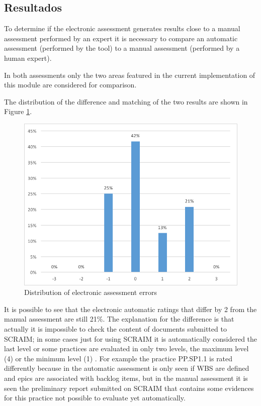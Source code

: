 \documentclass[9pt,a4paper]{extarticle}
\begin{document}
\begin{multicols}{2}
\subsection{Resultados}
To determine if the electronic assessment generates results close to a manual assessment performed by an expert it is necessary to compare an automatic assessment (performed by the tool) to a manual assessment (performed by a human expert).

In both assessments only the two areas featured in the current implementation of this module are considered for comparison.

The distribution of the difference and matching of the two results are shown in Figure \ref{fig:figura2}.

\begin{figure}[H]
	\centerline{\includegraphics[scale=.5]{delta.png}}
	\caption{Distribution of electronic assessment errors}  
	\label{fig:figura2}
\end{figure}


It is possible to see that the electronic automatic ratings that differ by 2 from the manual assessment are still 21\%. The explanation for the difference is that actually it is impossible to check the content of documents submitted to SCRAIM; in some cases just for using SCRAIM  it is automatically considered the last level or some practices are evaluated in only two levels, the maximum level (4) or the minimum level (1) . For example the practice PP.SP1.1 is rated differently because in the automatic assessment is only seen if WBS are defined and epics are associated with backlog items, but in the manual assessment it is seen the preliminary report submitted on SCRAIM that contains some evidences for this practice not possible to evaluate yet
automatically.


\end{multicols}
\end{document}
